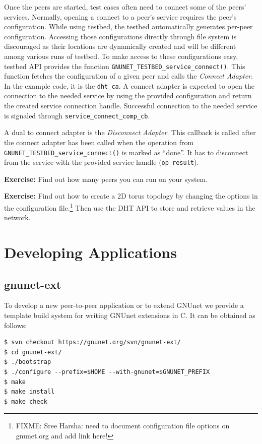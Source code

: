 \documentclass[10pt]{article}
\newcommand{\exercise}[1]{\noindent\begin{boxedminipage}{\textwidth}{\bf Exercise:} #1 \end{boxedminipage}}
\begin{document}
Once the peers are started, test cases often need to connect some of the peers'
services.  Normally, opening a connect to a peer's service requires the peer's
configuration.  While using testbed, the testbed automatically generates
per-peer configuration.  Accessing those configurations directly through file
system is discouraged as their locations are dynamically created and will be
different among various runs of testbed.  To make access to these configurations
easy, testbed API provides the function
\texttt{GNUNET\_TESTBED\_service\_connect()}.  This function fetches the
configuration of a given peer and calls the \textit{Connect Adapter}.
In the example code, it is the \texttt{dht\_ca}.  A connect adapter is expected
to open the connection to the needed service by using the provided configuration
and return the created service connection handle.  Successful connection to the
needed service is signaled through \texttt{service\_connect\_comp\_cb}.

A dual to connect adapter is the \textit{Disconnect Adapter}.  This callback is
called after the connect adapter has been called when the operation from
\texttt{GNUNET\_TESTBED\_service\_connect()} is marked as ``done''.  It has to
disconnect from the service with the provided service handle (\texttt{op\_result}).

\exercise{Find out how many peers you can run on your system.}

\exercise{Find out how to create a 2D torus topology by changing the
  options in the configuration file.\footnote{FIXME: Sree Harsha: need to 
  document configuration file options on gnunet.org and add link here!}
  Then use the DHT API to store and retrieve values in the
  network.}

\section{Developing Applications}
\subsection{gnunet-ext}
To develop a new peer-to-peer application or to extend GNUnet we provide
a template build system for writing GNUnet extensions in C. It can be
obtained as follows:

\lstset{language=bash}
\begin{lstlisting}
$ svn checkout https://gnunet.org/svn/gnunet-ext/
$ cd gnunet-ext/
$ ./bootstrap
$ ./configure --prefix=$HOME --with-gnunet=$GNUNET_PREFIX
$ make
$ make install
$ make check
\end{lstlisting}
\end{document}
